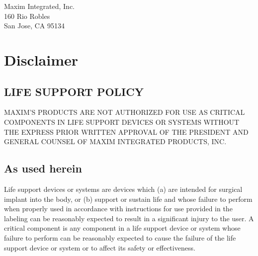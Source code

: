 \documentclass[twoside]{book}
\newcommand\docrev{Revision F }
\newcommand\docref{SPEC98T17 }
\newcommand\docdate{07/16/2017 }
\newcommand{\+}{\discretionary{\mbox{\scriptsize$\hookleftarrow$}}{}{}}
\begin{document}
\hypersetup{pageanchor=false,
             bookmarksnumbered=true,
             pdfencoding=unicode
            }
\begin{titlepage}
\vspace*{7cm}

\vspace*{7cm}
\begin{flushright}
Maxim Integrated, Inc.\\
160 Rio Robles\\
San Jose, CA 95134\\
\end{flushright}

\end{titlepage}

\section*{Disclaimer}

\subsection*{LIFE SUPPORT POLICY}
MAXIM’S PRODUCTS ARE NOT AUTHORIZED FOR USE AS CRITICAL COMPONENTS IN LIFE SUPPORT DEVICES OR SYSTEMS WITHOUT THE EXPRESS PRIOR WRITTEN APPROVAL OF THE PRESIDENT AND GENERAL COUNSEL OF MAXIM INTEGRATED PRODUCTS, INC.

\subsection*{As used herein}
Life support devices or systems are devices which (a) are intended for surgical implant into the body, or (b) support or sustain life and whose failure to perform when properly used in accordance with instructions for use provided in the labeling can be reasonably expected to result in a significant injury to the user. A critical component is any component in a life support device or system whose failure to perform can be reasonably expected to cause the failure of the life support device or system or to affect its safety or effectiveness.
\end{document}
